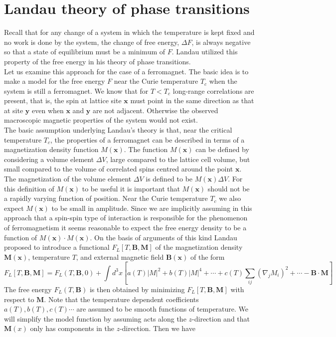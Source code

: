 \section{Landau theory of phase transitions}
Recall that for any change of a system in which the temperature is kept fixed and no work is done by the system, the change of free energy, $\Delta F$, is always negative so that a state of equilibrium must be a minimum of $F$. Landau utilized this property of the free energy in his theory of phase transitions.
\\
Let us examine this approach for the case of a ferromagnet. The basic idea is to make a model for the free energy $F$ near the Curie temperature $T_c$ when the system is still a ferromagnet. We know that for $T < T_c$ long-range correlations are present, that is, the spin at lattice site $\bm{x}$ must point in the same direction as that at site $\bm{y}$ even when $\bm{x}$ and $\bm{y}$ are not adjacent. Otherwise the observed macroscopic magnetic properties of the system would not exist.
\\
The basic assumption underlying Landau's theory is that, near the critical temperature $T_c$, the properties of a ferromagnet can be described in terms of a magnetization density function $M(\bm{x})$. 
The function $M(\bm{x})$ can be defined by considering a volume element $\Delta V$, large compared to the lattice cell volume, but small compared to the volume of correlated spins centred around the point $\bm{x}$. 
The magnetization of the volume element $\Delta V$ is defined to be $M(\bm{x}) \Delta V$. For this definition of $M(\bm{x})$ to be useful it is important that $M(\bm{x})$ should not be a rapidly varying function of position. Near the Curie temperature $T_c$ we also expect $M(\bm{x})$ to be small in amplitude. 
Since we are implicitly assuming in this approach that a spin-spin type of interaction is responsible for the phenomenon of ferromagnetism it seems reasonable to expect the free energy density to be a function of $M(\bm{x})\cdot M(\bm{x})$. On the basis of arguments of this kind Landau proposed to introduce a functional $F_L[T,\bm{B},\bm{M}]$ of the magnetization density $\bm{M}(\bm{x})$, temperature $T$, and external magnetic field $\bm{B}(\bm{x})$ of the form
\[F_L[T,\bm{B},\bm{M}] = F_L(T,\bm{B},0) + \int d^3x \left[ a(T)|M|^2 + b(T)|M|^4 + \cdots + c(T)\sum_{ij} (\nabla_jM_i)^2 + \cdots - \bm{B}\cdot\bm{M} \right]\]
The free energy $F_L(T,\bm{B})$ is then obtained by minimizing $F_L[T,\bm{B},\bm{M}]$ with respect to $\bm{M}$. Note that the temperature dependent coefficients $a(T), b(T), c(T) \cdots$ are assumed to be smooth functions of temperature. We will simplify the model function by assuming  acts along the $z$-direction and that $\bm{M}(x)$ only has components in the $z$-direction. Then we have
